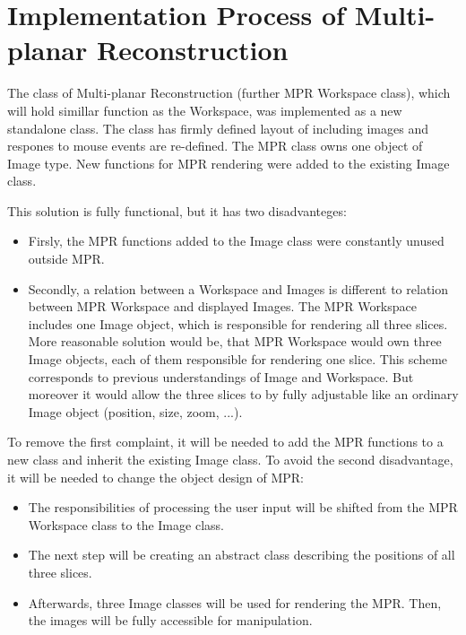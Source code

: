 \section{Implementation Process of Multi-planar Reconstruction}

The class of Multi-planar Reconstruction (further MPR Workspace class), which will hold simillar function as the Workspace, was implemented as a new standalone class. The class has firmly defined layout of including images and respones to mouse events are re-defined. The MPR class owns one object of Image type. New functions for MPR rendering were added to the existing Image class.

This solution is fully functional, but it has two disadvanteges:

\begin{itemize}
\item Firsly, the MPR functions added to the Image class were constantly unused outside MPR.
\item Secondly, a relation between a Workspace and Images is different to relation between MPR Workspace and displayed Images. The MPR Workspace includes one Image object, which is responsible for rendering all three slices. More reasonable solution would be, that MPR Workspace would own three Image objects, each of them responsible for rendering one slice. This scheme corresponds to previous understandings of Image and Workspace. But moreover it would allow the three slices to by fully adjustable like an ordinary Image object (position, size, zoom, ...). 
\end{itemize}

To remove the first complaint, it will be needed to add the MPR functions to a new class and inherit the existing Image class. To avoid the second disadvantage, it will be needed to change the object design of MPR:

\begin{itemize}
\item The responsibilities of processing the user input will be shifted from the MPR Workspace class to the Image class.
\item The next step will be creating an abstract class describing the positions of all three slices.
\item Afterwards, three Image classes will be used for rendering the MPR. Then, the images will be fully accessible for manipulation.
\end{itemize}



